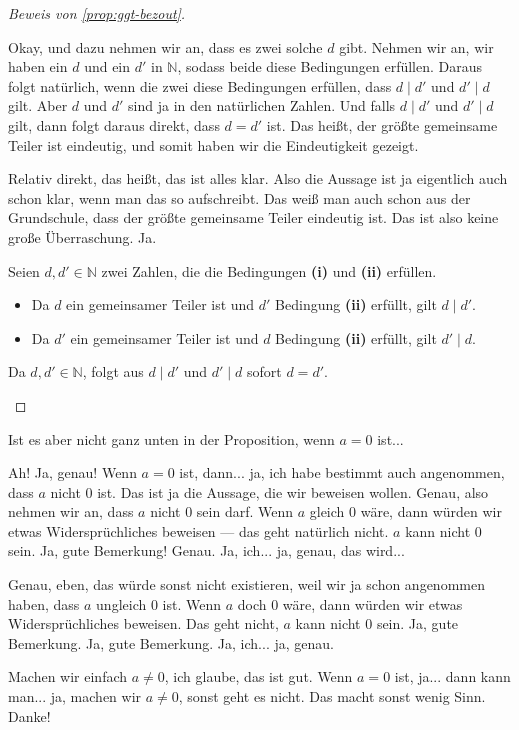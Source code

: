 \begin{proof}[Beweis von \cref{prop:ggt-bezout}]
\begin{spoken-clean}[00:23:34 - 00:25:45]
Okay, und dazu nehmen wir an, dass es zwei solche $d$ gibt. Nehmen wir an, wir haben ein $d$ und ein $d'$ in $\mathbb{N}$, sodass beide diese Bedingungen erfüllen. Daraus folgt natürlich, wenn die zwei diese Bedingungen erfüllen, dass $d \mid d'$ und $d' \mid d$ gilt. Aber $d$ und $d'$ sind ja in den natürlichen Zahlen. Und falls $d \mid d'$ und $d' \mid d$ gilt, dann folgt daraus direkt, dass $d = d'$ ist. Das heißt, der größte gemeinsame Teiler ist eindeutig, und somit haben wir die Eindeutigkeit gezeigt.

Relativ direkt, das heißt, das ist alles klar. Also die Aussage ist ja eigentlich auch schon klar, wenn man das so aufschreibt. Das weiß man auch schon aus der Grundschule, dass der größte gemeinsame Teiler eindeutig ist. Das ist also keine große Überraschung. Ja.
\end{spoken-clean}

\begin{math-stroke}
Seien $d, d' \in \mathbb{N}$ zwei Zahlen, die die Bedingungen \textbf{(i)} und \textbf{(ii)} erfüllen.
\begin{itemize}
    \item Da $d$ ein gemeinsamer Teiler ist und $d'$ Bedingung \textbf{(ii)} erfüllt, gilt $d \mid d'$.
    \item Da $d'$ ein gemeinsamer Teiler ist und $d$ Bedingung \textbf{(ii)} erfüllt, gilt $d' \mid d$.
\end{itemize}
Da $d, d' \in \mathbb{N}$, folgt aus $d \mid d'$ und $d' \mid d$ sofort $d = d'$.
\end{math-stroke}
\end{proof}

\begin{student-interaction}
Ist es aber nicht ganz unten in der Proposition, wenn $a=0$ ist...
\end{student-interaction}

\begin{spoken-clean}[00:25:45 - 00:26:09]
Ah! Ja, genau! Wenn $a=0$ ist, dann... ja, ich habe bestimmt auch angenommen, dass $a$ nicht $0$ ist. Das ist ja die Aussage, die wir beweisen wollen. Genau, also nehmen wir an, dass $a$ nicht $0$ sein darf. Wenn $a$ gleich $0$ wäre, dann würden wir etwas Widersprüchliches beweisen --- das geht natürlich nicht. $a$ kann nicht $0$ sein. Ja, gute Bemerkung! Genau. Ja, ich... ja, genau, das wird...

Genau, eben, das würde sonst nicht existieren, weil wir ja schon angenommen haben, dass $a$ ungleich $0$ ist. Wenn $a$ doch $0$ wäre, dann würden wir etwas Widersprüchliches beweisen. Das geht nicht, $a$ kann nicht $0$ sein. Ja, gute Bemerkung. Ja, gute Bemerkung. Ja, ich... ja, genau.

Machen wir einfach $a \neq 0$, ich glaube, das ist gut. Wenn $a = 0$ ist, ja... dann kann man... ja, machen wir $a \neq 0$, sonst geht es nicht. Das macht sonst wenig Sinn. Danke!
\end{spoken-clean}

